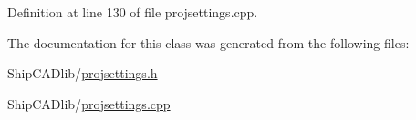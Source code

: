 Definition at line 130 of file projsettings.\-cpp.



The documentation for this class was generated from the following files\-:\begin{DoxyCompactItemize}
\item 
Ship\-C\-A\-Dlib/\hyperlink{projsettings_8h}{projsettings.\-h}\item 
Ship\-C\-A\-Dlib/\hyperlink{projsettings_8cpp}{projsettings.\-cpp}\end{DoxyCompactItemize}
